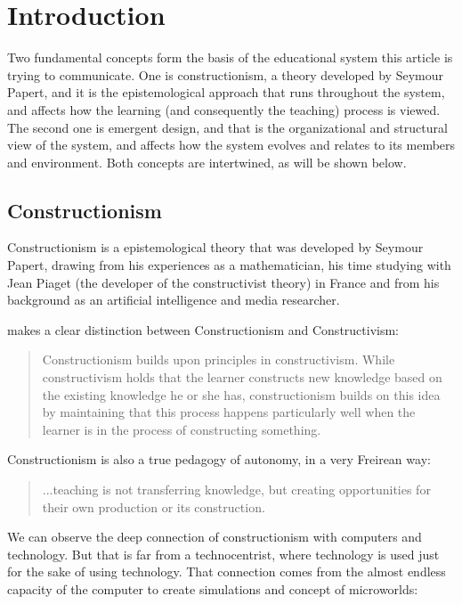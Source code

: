 \section{Introduction}


Two fundamental concepts form the basis of the educational system this article is trying to
communicate. One is constructionism, a theory developed by Seymour Papert, and
it is the epistemological approach that runs throughout the system, and affects
how the learning (and consequently the teaching) process is viewed. The second
one is emergent design, and that is the organizational and structural view of
the system, and affects how the system evolves and relates to its members and
environment. Both concepts are intertwined, as will be shown below. 

\subsection{Constructionism}
Constructionism is a epistemological theory that was developed by Seymour
Papert, drawing from his experiences as a mathematician, his time studying with
Jean Piaget (the developer of the constructivist theory) in France and from his
background as an artificial intelligence and media researcher.

\cite{education:cavallo_building_knowledge} makes a clear distinction between Constructionism and
Constructivism:

\begin{quote}
  Constructionism builds upon principles in constructivism. While constructivism
  holds that the learner constructs new knowledge based on the existing knowledge
  he or she has, constructionism builds on this idea by maintaining that this
  process happens particularly well when the learner is in the process of
  constructing something.                   
  
\end{quote}

Constructionism is also a true pedagogy of autonomy, in a very Freirean way:
\begin{quote}
...teaching is not transferring knowledge, but creating opportunities for their own
production or its construction.
\cite{education:paulo_freire__pedagogia_da_autonomia}
\end{quote}

We can observe the deep connection of constructionism with computers and
technology. But that is far from a technocentrist, where technology is used just
for the sake of using technology. That connection comes from the almost endless
capacity of the computer to create simulations and concept of microworlds:

